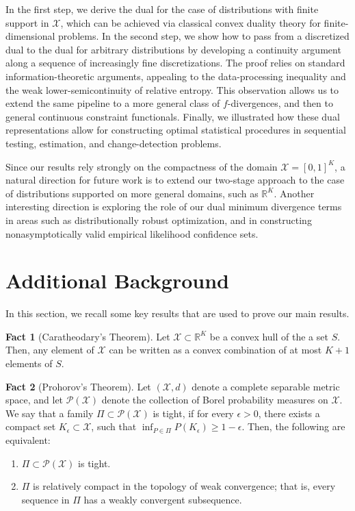 \documentclass{article}
\theoremstyle{plain}
\theoremstyle{definition}
\newtheorem{fact}[fact]{Fact}
\newcommand{\calP}{\mathcal P}
\newcommand{\calX}{\mathcal X}
\begin{document}
    In the first step, we derive the dual for the case of distributions with finite support in $\calX$, which can be achieved via classical convex duality theory for finite-dimensional problems. In the second step, we show how to pass from a discretized dual to the dual for arbitrary distributions by developing a continuity argument along a sequence of increasingly fine discretizations. The proof relies on standard information-theoretic arguments, appealing to the data-processing inequality and the weak lower-semicontinuity of relative entropy. This observation allows us to extend the same pipeline to a more general class of $f$-divergences, and then to general continuous constraint functionals. 
    Finally, we  illustrated how these dual representations allow for constructing optimal statistical procedures in sequential testing, estimation, and change-detection problems. 
    
    
    Since our results rely strongly on the compactness of the domain $\calX = [0,1]^K$, a natural direction for future work is to extend our two-stage approach to the case of distributions supported on more general domains, such as $\mathbb{R}^K$. Another interesting direction is exploring the role of our dual minimum divergence terms in areas such as distributionally robust optimization, and in constructing nonasymptotically valid empirical likelihood confidence sets.
    





\appendix 


\section{Additional Background}
In this section, we recall some key results that are used to prove our main results. 
\begin{fact}[Caratheodary's Theorem]
    \label{fact:caratheodary}
    Let $\calX \subset \mathbb{R}^K$ be a convex hull of the a set $S$. Then, any element of $\calX$ can be written as a convex combination of at most $K+1$ elements of $S$. 
\end{fact}

\begin{fact}[Prohorov's Theorem]
    \label{fact:prohorov} Let $(\calX, d)$  denote a complete separable metric space, and let $\calP(\calX)$ denote the collection of Borel probability  measures on $\calX$. We say that a family $\Pi \subset \calP(\calX)$ is tight, if for every $\epsilon >0$, there exists a compact set $K_\epsilon \subset \calX$, such that $\inf_{P \in \Pi} P(K_\epsilon) \geq 1-\epsilon$. Then, the following are equivalent: 
    \begin{enumerate}
        \item $\Pi \subset \calP(\calX)$ is tight. 
        \item $\Pi$ is relatively compact in the topology of weak convergence; that is, every sequence in $\Pi$ has a weakly convergent subsequence. 
    \end{enumerate}
\end{fact}
\end{document}
